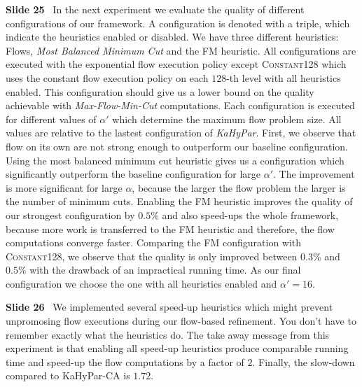 \documentclass[11pt]{llncs}
\newcommand{\Constant}[1]{\textsc{Constant#1}}
\newcommand{\KaHyPar}[1]{KaHyPar-#1}
\newcommand{\fakepar}[1]{\medskip\par\textbf{#1}\ }
\begin{document}
\fakepar{Slide 25} In the next experiment we evaluate the quality of different configurations
of our framework. A configuration is denoted with a triple, which indicate the heuristics enabled or
disabled. We have three different heuristics: Flows, \emph{Most Balanced Minimum Cut} and the FM heuristic.
All configurations are executed with the exponential flow execution policy except \Constant{128} which uses
the constant flow execution policy on each $128$-th level with all heuristics enabled. This configuration
should give us a lower bound on the quality achievable with \emph{Max-Flow-Min-Cut} computations.
Each configuration is executed for different values of $\alpha'$ which determine the maximum flow
problem size. All values are relative to the lastest configuration of \emph{KaHyPar}. First, we observe that
flow on its own are not strong enough to outperform our baseline configuration. Using the most balanced
minimum cut heuristic gives us a configuration which significantly outperform the baseline configuration
for large $\alpha'$. The improvement is more significant for large $\alpha$, because the larger the
flow problem the larger is the number of minimum cuts. Enabling the FM heuristic improves the quality
of our strongest configuration by $0.5\%$ and also speed-ups the whole framework, because more work 
is transferred to the FM heuristic and therefore, the flow computations converge faster. Comparing
the FM configuration with \Constant{128}, we observe that the quality is only improved between $0.3\%$
and $0.5\%$ with the drawback of an impractical running time. As our final configuration we choose 
the one with all heuristics enabled and $\alpha' = 16$.\\

\fakepar{Slide 26} We implemented several speed-up heuristics which might prevent unpromosing
flow executions during our flow-based refinement. You don't have to remember exactly what the heuristics
do. The take away message from this experiment is that enabling all speed-up heuristics produce comparable
running time and speed-up the flow computations by a factor of $2$. Finally, the slow-down compared to 
\KaHyPar{CA} is $1.72$. 
\end{document}
